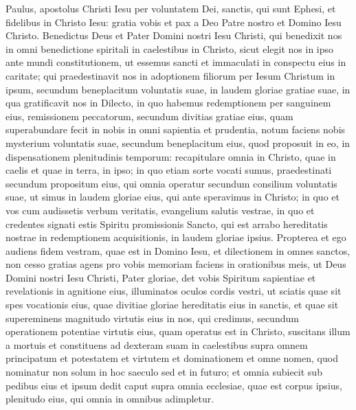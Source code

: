 \begin{biblechapter}
 \verse Paulus, apostolus Christi Iesu per voluntatem Dei, sanctis, qui sunt Ephesi, et fidelibus in Christo Iesu: 
\verse gratia vobis et pax a Deo Patre nostro et Domino Iesu Christo.
 \verse Benedictus Deus et Pater Domini nostri Iesu Christi,
 qui benedixit nos in omni benedictione spiritali in caelestibus in Christo,
 \verse sicut elegit nos in ipso ante mundi constitutionem,
 ut essemus sancti et immaculati in conspectu eius in caritate;
 \verse qui praedestinavit nos in adoptionem filiorum
 per Iesum Christum in ipsum,
 secundum beneplacitum voluntatis suae,
 \verse in laudem gloriae gratiae suae,
 in qua gratificavit nos in Dilecto,
 \verse in quo habemus redemptionem per sanguinem eius,
 remissionem peccatorum,
 secundum divitias gratiae eius,
 \verse quam superabundare fecit in nobis
 in omni sapientia et prudentia,
 \verse notum faciens nobis mysterium voluntatis suae,
 secundum beneplacitum eius, quod proposuit in eo,
 \verse in dispensationem plenitudinis temporum:
 recapitulare omnia in Christo,
 quae in caelis et quae in terra, in ipso;
 \verse in quo etiam sorte vocati sumus, praedestinati secundum propositum eius, qui omnia operatur secundum consilium voluntatis suae, 
\verse ut simus in laudem gloriae eius, qui ante speravimus in Christo; 
\verse in quo et vos cum audissetis verbum veritatis, evangelium salutis vestrae, in quo et credentes signati estis Spiritu promissionis Sancto, 
\verse qui est arrabo hereditatis nostrae in redemptionem acquisitionis, in laudem gloriae ipsius.
 \verse Propterea et ego audiens fidem vestram, quae est in Domino Iesu, et dilectionem in omnes sanctos, 
\verse non cesso gratias agens pro vobis memoriam faciens in orationibus meis, 
\verse ut Deus Domini nostri Iesu Christi, Pater gloriae, det vobis Spiritum sapientiae et revelationis in agnitione eius, 
\verse illuminatos oculos cordis vestri, ut sciatis quae sit spes vocationis eius, quae divitiae gloriae hereditatis eius in sanctis, 
\verse et quae sit supereminens magnitudo virtutis eius in nos, qui credimus, secundum operationem potentiae virtutis eius, 
\verse quam operatus est in Christo, suscitans illum a mortuis et constituens ad dexteram suam in caelestibus 
\verse supra omnem principatum et potestatem et virtutem et dominationem et omne nomen, quod nominatur non solum in hoc saeculo sed et in futuro; 
\verse et omnia subiecit sub pedibus eius et ipsum dedit caput supra omnia ecclesiae, 
\verse quae est corpus ipsius, plenitudo eius, qui omnia in omnibus adimpletur.
 

\end{biblechapter}

